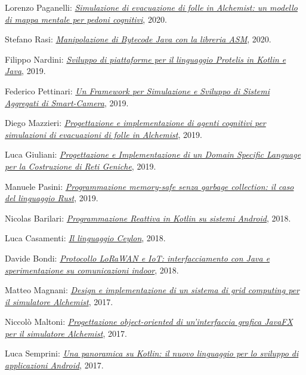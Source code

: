 \begin{outerlist}
\begin{innerlist}
      \item Lorenzo Paganelli: \href{https://amslaurea.unibo.it/20540/}{\textit{Simulazione di evacuazione di folle in Alchemist: un modello di mappa mentale per pedoni cognitivi}}, 2020.
      \item Stefano Rasi: \href{https://amslaurea.unibo.it/20505/}{\textit{Manipolazione di Bytecode Java con la libreria ASM}}, 2020.
      \item Filippo Nardini: \href{https://amslaurea.unibo.it/19778/}{\textit{Sviluppo di piattaforme per il linguaggio Protelis in Kotlin e Java}}, 2019.
      \item Federico Pettinari: \href{https://amslaurea.unibo.it/19092/}{\textit{Un Framework per Simulazione e Sviluppo di Sistemi Aggregati di Smart-Camera}}, 2019.
      \item Diego Mazzieri: \href{https://amslaurea.unibo.it/19084/}{\textit{Progettazione e implementazione di agenti cognitivi per simulazioni di evacuazioni di folle in Alchemist}}, 2019.
      \item Luca Giuliani: \href{https://amslaurea.unibo.it/19071/}{\textit{Progettazione e Implementazione di un Domain Specific Language per la Costruzione di Reti Geniche}}, 2019.
      \item Manuele Pasini: \href{http://amslaurea.unibo.it/18535/}{\textit{Programmazione memory-safe senza garbage collection: il caso del linguaggio Rust}}, 2019.
      \item Nicolas Barilari: \href{http://amslaurea.unibo.it/16841/}{\textit{Programmazione Reattiva in Kotlin su sistemi Android}}, 2018.
      \item Luca Casamenti: \href{http://amslaurea.unibo.it/16788/}{\textit{Il linguaggio Ceylon}}, 2018.
      \item Davide Bondi: \href{http://amslaurea.unibo.it/15730/}{\textit{Protocollo LoRaWAN e IoT: interfacciamento con Java e sperimentazione su comunicazioni indoor}}, 2018.
      \item Matteo Magnani: \href{http://amslaurea.unibo.it/17133/}{\textit{Design e implementazione di un sistema di grid computing per il simulatore Alchemist}}, 2017.
      \item Niccolò Maltoni: \href{http://amslaurea.unibo.it/14682/}{\textit{Progettazione object-oriented di un'interfaccia grafica JavaFX per il simulatore Alchemist}}, 2017.
      \item Luca Semprini: \href{http://amslaurea.unibo.it/14673/}{\textit{Una panoramica su Kotlin: il nuovo linguaggio per lo sviluppo di applicazioni Android}}, 2017.

\end{innerlist}
\end{outerlist}
